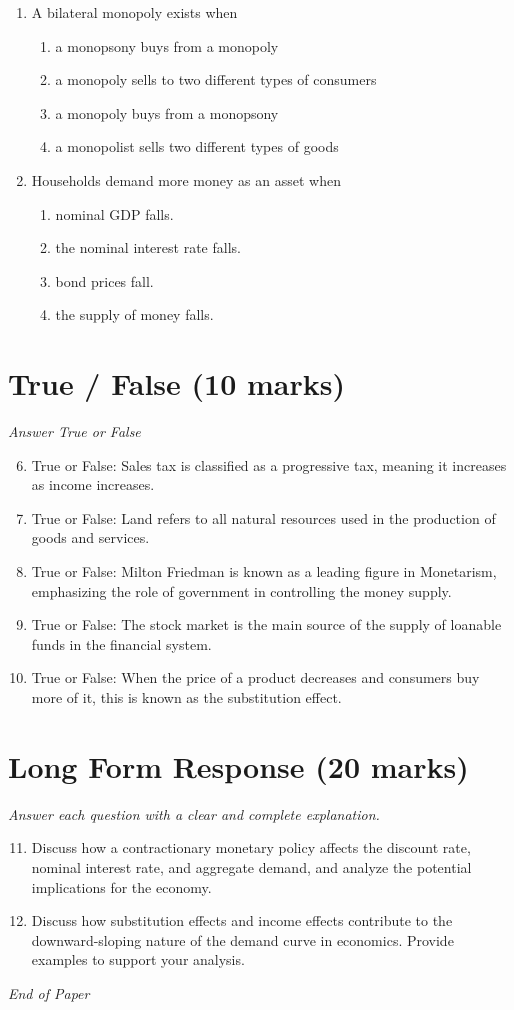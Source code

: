 \documentclass[12pt]{article}
\begin{document}
\begin{enumerate}[label=\arabic*.]
\item A bilateral monopoly exists when
\begin{enumerate}[label=(\alph*)]
    \item a monopsony buys from a monopoly
    \item a monopoly sells to two different types of consumers
    \item a monopoly buys from a monopsony
    \item a monopolist sells two different types of goods
\end{enumerate}
\item Households demand more money as an asset when
\begin{enumerate}[label=(\alph*)]
    \item nominal GDP falls.
    \item the nominal interest rate falls.
    \item bond prices fall.
    \item the supply of money falls.
\end{enumerate}
\end{enumerate}

\section*{True / False (10 marks)}
\textit{Answer True or False}
\begin{enumerate}[label=\arabic*.]
\setcounter{enumi}{5}
\item True or False: Sales tax is classified as a progressive tax, meaning it increases as income increases.
\item True or False: Land refers to all natural resources used in the production of goods and services.
\item True or False: Milton Friedman is known as a leading figure in Monetarism, emphasizing the role of government in controlling the money supply.
\item True or False: The stock market is the main source of the supply of loanable funds in the financial system.
\item True or False: When the price of a product decreases and consumers buy more of it, this is known as the substitution effect.
\end{enumerate}

\section*{Long Form Response (20 marks)}
\textit{Answer each question with a clear and complete explanation.}
\begin{enumerate}[label=\arabic*.]
\setcounter{enumi}{10}
\item Discuss how a contractionary monetary policy affects the discount rate, nominal interest rate, and aggregate demand, and analyze the potential implications for the economy.
\item Discuss how substitution effects and income effects contribute to the downward-sloping nature of the demand curve in economics. Provide examples to support your analysis.
\end{enumerate}

\vfill
\noindent\textit{End of Paper}
\end{document}
